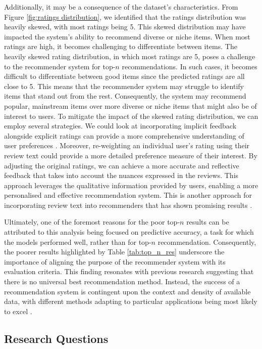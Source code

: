 Additionally, it may be a consequence of the dataset's characteristics. From Figure \ref{fig:ratings distribution}, we identified that the ratings distribution was heavily skewed, with most ratings being 5. This skewed distribution may have impacted the system's ability to recommend diverse or niche items. When most ratings are high, it becomes challenging to differentiate between items. The heavily skewed rating distribution, in which most ratings are 5, poses a challenge to the recommender system for top-$n$ recommendations. In such cases, it becomes difficult to differentiate between good items since the predicted ratings are all close to 5. This means that the recommender system may struggle to identify items that stand out from the rest. Consequently, the system may recommend popular, mainstream items over more diverse or niche items that might also be of interest to users. To mitigate the impact of the skewed rating distribution, we can employ several strategies. We could look at incorporating implicit feedback alongside explicit ratings can provide a more comprehensive understanding of user preferences \cite{peska2017using}. Moreover, re-weighting an individual user's rating using their review text could provide a more detailed preference measure of their interest. By adjusting the original ratings, we can achieve a more accurate and reflective feedback that takes into account the nuances expressed in the reviews. This approach leverages the qualitative information provided by users, enabling a more personalised and effective recommendation system. This is another approach for incorporating review text into recommenders that has shown promising results \cite{hariri2011context}.

Ultimately, one of the foremost reasons for the poor top-$n$ results can be attributed to this analysis being focused on predictive accuracy, a task for which the models performed well, rather than for top-$n$ recommendation. Consequently, the poorer results highlighted by Table \ref{tab:top_n_res} underscore the importance of aligning the purpose of the recommender system with its evaluation criteria. This finding resonates with previous research suggesting that there is no universal best recommendation method. Instead, the success of a recommendation system is contingent upon the context and density of available data, with different methods adapting to particular applications being most likely to excel \cite{lu2012recommender}. 

\subsection{Research Questions}
\label{subsec:Research Questions}

